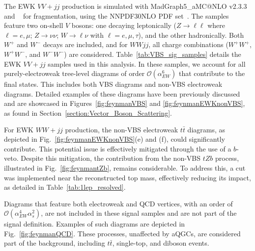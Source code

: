 The EWK $VV+jj$ production is simulated with MadGraph5\_aMC@NLO v2.3.3~\cite{Alwall:2014hca} and ~\cite{Sjostrand:2007gs} for fragmentation, using the \textsc{NNPDF30NLO} PDF set~\cite{Ball:2012cx}. 
The samples feature two on-shell $V$ bosons: one decaying leptonically ($Z \to \ell\ell$ where $\ell = e, \mu$; $Z \to \nu\nu$; $W \to \ell \nu$ with $\ell= e, \mu, \tau$), and the other hadronically. 
Both $W^{+}$ and $W^{-}$ decays are included, and for $WWjj$, all charge combinations ($W^{+}W^{+}$, $W^{+}W^{-}$, and $W^{-}W^{-}$) are considered. 
Table~\ref{tab:VBS_sig_samples} details the EWK $VV+jj$ samples used in this analysis.
In these samples, we account for all purely-electroweak tree-level diagrams of order $\mathcal{O}(\alpha_{EW}^6)$ that contribute to the final states. This includes both VBS diagrams and non-VBS electroweak diagrams. Detailed examples of these diagrams have been previously discussed and are showcased in Figures~\ref{fig:feynmanVBS} and \ref{fig:feynmanEWKnonVBS}, as found in Section~\ref{section:Vector_Boson_Scattering}.


For EWK $WW+jj$ production, the non-VBS electroweak $t\bar{t}$ diagrams, as depicted in Fig.~\ref{fig:feynmanEWKnonVBS}(e) and (f), could significantly contribute. This potential issue is effectively mitigated through the use of a $b$-veto. Despite this mitigation, the contribution from the non-VBS $tZb$ process, illustrated in Fig.~\ref{fig:feynmantZb}, remains considerable. To address this, a cut was implemented near the reconstructed top mass, effectively reducing its impact, as detailed in Table~\ref{tab:1lep_resolved}.

Diagrams that feature both electroweak and QCD vertices, with an order of $\mathcal{O}(\alpha_{EW}^{4} \alpha_s^{2})$, are not included in these signal samples and are not part of the signal definition.
Examples of such diagrams are depicted in Fig.~\ref{fig:feynmanQCD}. These processes, unaffected by aQGCs, are considered part of the background, including $t\bar{t}$, single-top, and diboson events.

